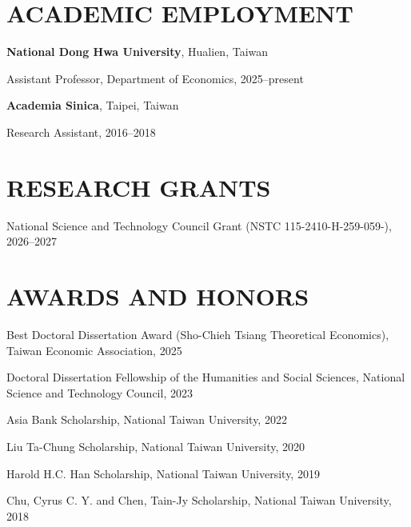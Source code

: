 \documentclass{article}
\newcommand{\cvsection}[1]{\section*{\MakeUppercase{#1}}}
\begin{document}





\cvsection{Academic Employment}
\indent
\textbf{National Dong Hwa University}, Hualien, Taiwan
\begin{cvlist}
    \item Assistant Professor, Department of Economics, 2025--present
\end{cvlist}

\textbf{Academia Sinica}, Taipei, Taiwan
\begin{cvlist}
    \item Research Assistant, 2016--2018
\end{cvlist}








\cvsection{Research Grants}

\begin{cvlist}
    \item National Science and Technology Council Grant (NSTC 115-2410-H-259-059-), 2026--2027
\end{cvlist}

\cvsection{Awards and Honors}

\begin{cvlist}
    \item Best Doctoral Dissertation Award (Sho-Chieh Tsiang Theoretical Economics), Taiwan Economic Association, 2025
    \item Doctoral Dissertation Fellowship of the Humanities and Social Sciences, National Science and Technology Council, 2023
    \item Asia Bank Scholarship, National Taiwan University, 2022
    \item Liu Ta-Chung Scholarship, National Taiwan University, 2020
    \item Harold H.C. Han Scholarship, National Taiwan University, 2019
    \item Chu, Cyrus C. Y. and Chen, Tain-Jy Scholarship, National Taiwan University, 2018
\end{cvlist}
\end{document}
